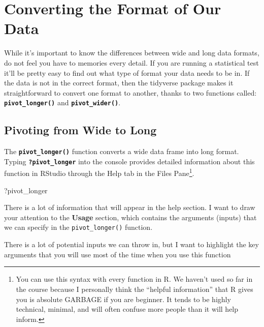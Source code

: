 \documentclass[
]{book}
\newenvironment{Shaded}{\begin{snugshade}}{\end{snugshade}}
\newcommand{\NormalTok}[1]{#1}
\begin{document}
\section{Converting the Format of Our Data}\label{converting-the-format-of-our-data}

While it's important to know the differences between wide and long data formats, do not feel you have to memories every detail. If you are running a statistical test it'll be pretty easy to find out what type of format your data needs to be in. If the data is not in the correct format, then the tidyverse package makes it straightforward to convert one format to another, thanks to two functions called: \textbf{\texttt{pivot\_longer()}} and \textbf{\texttt{pivot\_wider()}}.

\subsection{Pivoting from Wide to Long}\label{pivoting-from-wide-to-long}

The \textbf{\texttt{pivot\_longer()}} function converts a wide data frame into long format. Typing \textbf{\texttt{?pivot\_longer}} into the console provides detailed information about this function in RStudio through the Help tab in the Files Pane\footnote{You can use this syntax with every function in R. We haven't used so far in the course because I personally think the ``helpful information'' that R gives you is absolute GARBAGE if you are beginner. It tends to be highly technical, minimal, and will often confuse more people than it will help inform.}.

\begin{Shaded}
\begin{Highlighting}[]
\NormalTok{?pivot\_longer}
\end{Highlighting}
\end{Shaded}

There is a lot of information that will appear in the help section. I want to draw your attention to the \textbf{Usage} section, which contains the arguments (inputs) that we can specify in the \texttt{pivot\_longer()} function.

There is a lot of potential inputs we can throw in, but I want to highlight the key arguments that you will use most of the time when you use this function
\end{document}
